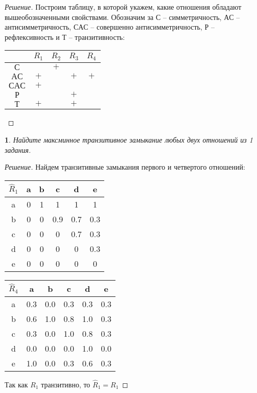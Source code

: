 \documentclass[11pt,a4paper,oneside]{article}
\newenvironment{problem}{
	\medskip
	\begin{problem-internal}
	}{
	\end{problem-internal}
}
\newenvironment{solution}{
	\begin{proof}[Решение]
		\vspace{-8px}
		\setlength{\parskip}{4px}
		\setlength{\parindent}{0px}
	}{
	\end{proof}
}
\newtheorem{problem-internal}{}
\newcommand{\+}{$\boldsymbol{+}$}
\begin{document}
	\begin{solution}
		Построим таблицу, в которой укажем, какие отношения обладают вышеобозначенными свойствами. Обозначим за $С$ -- симметричность, $АС$ -- антисимметричность, $САС$ -- совершенно антисимметричность, $Р$ -- рефлексивность и $Т$ -- транзитивность:
		\begin{table}[!htbp]
			\centering
			\begin{tabular}{|c|c|c|c|c|}
				\hline
						& $R_1$ & $R_2$ & $R_3$ & $R_4$ \\ \hline
				$С$   	&       &   \+  &       &       \\ \hline
				$АС$  	&   \+  &       &  \+   &  \+   \\ \hline
				$САС$ 	&   \+  &       &       &       \\ \hline
				$Р$   	&       &       &   \+  &       \\ \hline
				$Т$   	&   \+  &       &   \+  &       \\ \hline
			\end{tabular}
		\end{table}
	
	\end{solution}
	\begin{problem}
		Найдите максминное транзитивное замыкание любых двух отношений из 1 задания.
	\end{problem}
	\begin{solution}
		Найдем транзитивные замыкания первого и четвертого отношений:
		\begin{table}[!hbtp]
			\centering
			\begin{tabular}{|c|c|c|c|c|c|}
				\hline
				$\hat{R}_1$ & a & b & c   & d   & e   \\ \hline
				a     & 0 & 1 & 1   & 1   & 1   \\ \hline
				b     & 0 & 0 & 0.9 & 0.7 & 0.3 \\ \hline
				c     & 0 & 0 & 0   & 0.7 & 0.3 \\ \hline
				d     & 0 & 0 & 0   & 0   & 0.3 \\ \hline
				e     & 0 & 0 & 0   & 0   & 0   \\ \hline
			\end{tabular}
			\quad
			\begin{tabular}{|c|c|c|c|c|c|}
				\hline
				$\hat{R}_4$ & a   & b & c   & d   & e   \\ \hline
				a     & 0.3 & 0.0 & 0.3 & 0.3 & 0.3 \\ \hline
				b     & 0.6 & 1.0 & 0.8 & 1.0 & 0.3 \\ \hline
				c     & 0.3 & 0.0 & 1.0 & 0.8 & 0.3 \\ \hline
				d     & 0.0 & 0.0 & 0.0 & 1.0 & 0.0 \\ \hline
				e     & 1.0 & 0.0 & 0.3 & 0.6 & 0.3 \\ \hline
			\end{tabular}
		\end{table}
		\newline
		Так как $R_1$ транзитивно, то $\hat{R}_1 = R_1$
	\end{solution}
\end{document}
